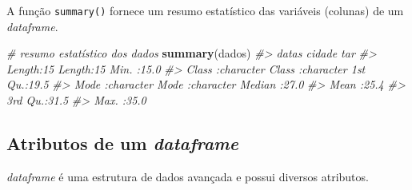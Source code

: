 \documentclass[]{book}
\newenvironment{Shaded}{\begin{snugshade}}{\end{snugshade}}
\newcommand{\KeywordTok}[1]{\textcolor[rgb]{0.13,0.29,0.53}{\textbf{#1}}}
\newcommand{\CommentTok}[1]{\textcolor[rgb]{0.56,0.35,0.01}{\textit{#1}}}
\newcommand{\NormalTok}[1]{#1}
\begin{document}
A função \texttt{summary()} fornece um resumo estatístico das variáveis
(colunas) de um \emph{dataframe}.

\begin{Shaded}
\begin{Highlighting}[]
\CommentTok{# resumo estatístico dos dados}
\KeywordTok{summary}\NormalTok{(dados)}
\CommentTok{#>     datas              cidade               tar      }
\CommentTok{#>  Length:15          Length:15          Min.   :15.0  }
\CommentTok{#>  Class :character   Class :character   1st Qu.:19.5  }
\CommentTok{#>  Mode  :character   Mode  :character   Median :27.0  }
\CommentTok{#>                                        Mean   :25.4  }
\CommentTok{#>                                        3rd Qu.:31.5  }
\CommentTok{#>                                        Max.   :35.0}
\end{Highlighting}
\end{Shaded}

\subsection{\texorpdfstring{Atributos de um
\emph{dataframe}}{Atributos de um dataframe}}\label{atributos-de-um-dataframe}

\emph{dataframe} é uma estrutura de dados avançada e possui diversos
atributos.
\end{document}
